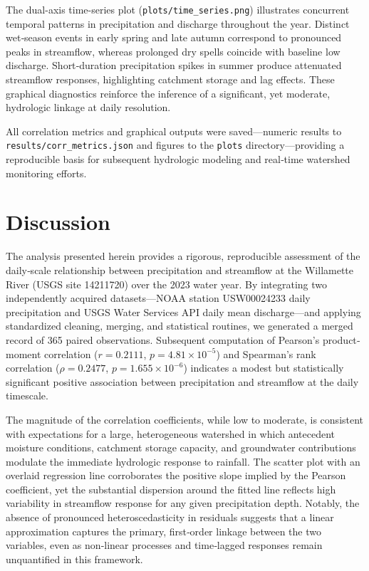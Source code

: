 \documentclass[preprint,12pt]{elsarticle}
\begin{document}
The dual-axis time-series plot (\texttt{plots/time\_series.png}) illustrates concurrent temporal patterns in precipitation and discharge throughout the year. Distinct wet‐season events in early spring and late autumn correspond to pronounced peaks in streamflow, whereas prolonged dry spells coincide with baseline low discharge. Short‐duration precipitation spikes in summer produce attenuated streamflow responses, highlighting catchment storage and lag effects. These graphical diagnostics reinforce the inference of a significant, yet moderate, hydrologic linkage at daily resolution.

All correlation metrics and graphical outputs were saved—numeric results to \texttt{results/corr\_metrics.json} and figures to the \texttt{plots} directory—providing a reproducible basis for subsequent hydrologic modeling and real‐time watershed monitoring efforts.

\section{Discussion}

The analysis presented herein provides a rigorous, reproducible assessment of the daily‐scale relationship between precipitation and streamflow at the Willamette River (USGS site 14211720) over the 2023 water year. By integrating two independently acquired datasets—NOAA station USW00024233 daily precipitation and USGS Water Services API daily mean discharge—and applying standardized cleaning, merging, and statistical routines, we generated a merged record of 365 paired observations. Subsequent computation of Pearson's product‐moment correlation ($r = 0.2111$, $p = 4.81\times10^{-5}$) and Spearman's rank correlation ($\rho = 0.2477$, $p = 1.655\times10^{-6}$) indicates a modest but statistically significant positive association between precipitation and streamflow at the daily timescale.

The magnitude of the correlation coefficients, while low to moderate, is consistent with expectations for a large, heterogeneous watershed in which antecedent moisture conditions, catchment storage capacity, and groundwater contributions modulate the immediate hydrologic response to rainfall. The scatter plot with an overlaid regression line corroborates the positive slope implied by the Pearson coefficient, yet the substantial dispersion around the fitted line reflects high variability in streamflow response for any given precipitation depth. Notably, the absence of pronounced heteroscedasticity in residuals suggests that a linear approximation captures the primary, first‐order linkage between the two variables, even as non‐linear processes and time‐lagged responses remain unquantified in this framework.
\end{document}
